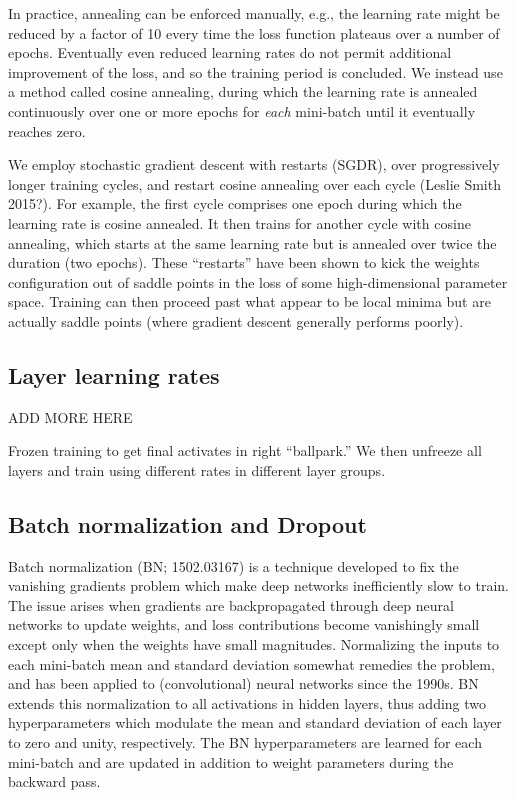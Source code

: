 \documentclass[fleqn,usenatbib]{mnras}
\begin{document}
In practice, annealing can be enforced manually, e.g., the learning rate might be reduced by a factor of 10 every time the loss function plateaus over a number of epochs.
Eventually even reduced learning rates do not permit additional improvement of the loss, and so the training period is concluded.
We instead use a method called cosine annealing, during which the learning rate is annealed continuously over one or more epochs for \textit{each} mini-batch until it eventually reaches zero.


We employ stochastic gradient descent with restarts (SGDR), over progressively longer training cycles, and restart cosine annealing over each cycle (Leslie Smith 2015?). 
For example, the first cycle comprises one epoch during which the learning rate is cosine annealed.
It then trains for another cycle with cosine annealing, which starts at the same learning rate but is annealed over twice the duration (two epochs).
These ``restarts'' have been shown to kick the weights configuration out of saddle points in the loss of some high-dimensional parameter space.
Training can then proceed past what appear to be local minima but are actually saddle points (where gradient descent generally performs poorly).


\subsection{Layer learning rates}
ADD MORE HERE

Frozen training to get final activates in right ``ballpark.''
We then unfreeze all layers and train using different rates in different layer groups.

\subsection{Batch normalization and Dropout}

Batch normalization (BN; 1502.03167) is a technique developed to fix the vanishing gradients problem which make deep networks inefficiently slow to train.
The issue arises when gradients are backpropagated through deep neural networks to update weights, and loss contributions become vanishingly small except only when the weights have small magnitudes.
Normalizing the inputs to each mini-batch mean and standard deviation somewhat remedies the problem, and has been applied to (convolutional) neural networks since the 1990s.
BN extends this normalization to all activations in hidden layers, thus adding two hyperparameters which modulate the mean and standard deviation of each layer to zero and unity, respectively.
The BN hyperparameters are learned for each mini-batch and are updated in addition to weight parameters during the backward pass.
\end{document}
